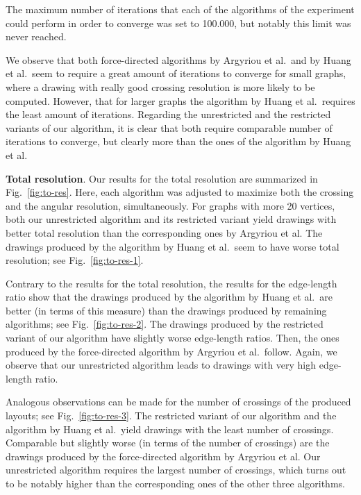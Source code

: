 \documentclass{comjnl}
\newcommand{\myparagraph}[1]{\medskip\noindent\textbf{#1}.}
\begin{document}
The maximum number of iterations that each of the algorithms of the experiment could perform in order to converge was set to 100.000, but notably this limit was never reached. 

We observe that both force-directed algorithms by Argyriou et al.\ and by Huang et al.\ seem to require a great amount of iterations to converge for small graphs, where a drawing with really good crossing resolution is more likely to be computed. However, that for larger graphs the algorithm by Huang et al.\ requires the least amount of iterations. Regarding the unrestricted and the restricted variants of our algorithm, it is clear that both require comparable number of iterations to converge, but clearly more than the ones of the algorithm by Huang et al.

\myparagraph{Total resolution} Our results for the total resolution are summarized in Fig.~\ref{fig:to-res}. Here, each algorithm was adjusted to maximize both the crossing and the angular resolution, simultaneously. For graphs with more 20 vertices, both our unrestricted algorithm and its restricted variant yield drawings with better total resolution than the corresponding ones by Argyriou et al. The drawings produced by the algorithm by Huang et al.\ seem to have worse total resolution; see Fig.~\ref{fig:to-res-1}.%

Contrary to the results for the total resolution, the results for the edge-length ratio show that the drawings produced by the algorithm by Huang et al.\ are better (in terms of this measure) than the drawings produced by remaining algorithms; see Fig.~\ref{fig:to-res-2}. 
The drawings produced by the restricted variant of our algorithm have slightly worse edge-length ratios. Then, the ones produced by the force-directed algorithm by Argyriou et al.\ follow. Again, we observe that our unrestricted algorithm leads to drawings with very high edge-length ratio.

Analogous observations can be made for the number of crossings of the produced layouts; see Fig.~\ref{fig:to-res-3}. The restricted variant of our algorithm and the algorithm by Huang et al.\ yield drawings with the least number of crossings. Comparable but slightly worse (in terms of the number of crossings) are the drawings produced by the force-directed algorithm by Argyriou et al. Our unrestricted algorithm requires the largest number of crossings, which turns out to be notably higher than the corresponding ones of the other three algorithms.
\end{document}
